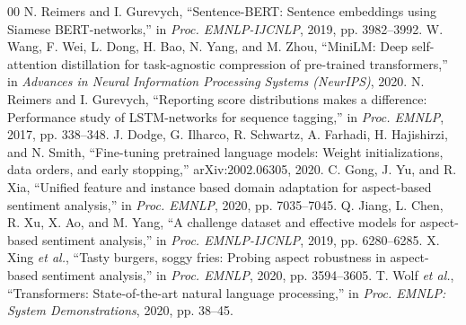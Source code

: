 \documentclass[conference]{IEEEtran}
\begin{document}
\begin{thebibliography}{00}
 N. Reimers and I. Gurevych, ``Sentence-BERT: Sentence embeddings using Siamese BERT-networks,'' in \emph{Proc. EMNLP-IJCNLP}, 2019, pp. 3982--3992.
 W. Wang, F. Wei, L. Dong, H. Bao, N. Yang, and M. Zhou, ``MiniLM: Deep self-attention distillation for task-agnostic compression of pre-trained transformers,'' in \emph{Advances in Neural Information Processing Systems (NeurIPS)}, 2020.
 N. Reimers and I. Gurevych, ``Reporting score distributions makes a difference: Performance study of LSTM-networks for sequence tagging,'' in \emph{Proc. EMNLP}, 2017, pp. 338--348.
 J. Dodge, G. Ilharco, R. Schwartz, A. Farhadi, H. Hajishirzi, and N. Smith, ``Fine-tuning pretrained language models: Weight initializations, data orders, and early stopping,'' arXiv:2002.06305, 2020.
 C. Gong, J. Yu, and R. Xia, ``Unified feature and instance based domain adaptation for aspect-based sentiment analysis,'' in \emph{Proc. EMNLP}, 2020, pp. 7035--7045.
 Q. Jiang, L. Chen, R. Xu, X. Ao, and M. Yang, ``A challenge dataset and effective models for aspect-based sentiment analysis,'' in \emph{Proc. EMNLP-IJCNLP}, 2019, pp. 6280--6285.
 X. Xing \emph{et al.}, ``Tasty burgers, soggy fries: Probing aspect robustness in aspect-based sentiment analysis,'' in \emph{Proc. EMNLP}, 2020, pp. 3594--3605.
 T. Wolf \emph{et al.}, ``Transformers: State-of-the-art natural language processing,'' in \emph{Proc. EMNLP: System Demonstrations}, 2020, pp. 38--45.
\end{thebibliography}
\end{document}

